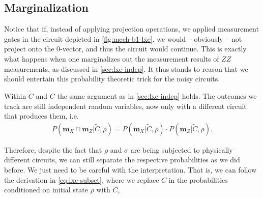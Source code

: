 \subsection{Marginalization}
\label{sec:lxe-err-subset}
Notice that if, instead of applying projection operations, we applied
measurement gates in the circuit depicted in \cref{fig:mech-b1-lxe}, we would
-- obviously -- not project onto the 0-vector, and thus the circuit would
continue. This is exactly what happens when one marginalizes out the
measurement results of $ZZ$ measurements, as discussed in \cref{sec:lxe-indep}.
It thus stands to reason that we should entertain this probability theoretic
trick for the noisy circuits.

Within $\tilde{C}$ and $C$ the same argument as in
\cref{sec:lxe-indep} holds. The outcomes we track are still independent
random variables, now only with a different circuit that produces them,
i.e. 
\begin{align}
  P(\mathbf{m}_X \cap \mathbf{m}_Z | \tilde{C}, \rho) = 
  P(\mathbf{m}_X | \tilde{C}, \rho)\cdot P(\mathbf{m}_Z | \tilde{C}, \rho)
.\end{align}

Therefore, despite the fact that $\rho$ and $\sigma$ are being subjected to physically
different circuits, we can still separate the respective probabilities as we
did before. We just need to be careful with the interpretation. That is, we can
follow the derivation in \cref{eq:lxe-subset}, where we replace $C$ in the
probabilities conditioned on initial state $\rho$ with $\tilde{C}$,

